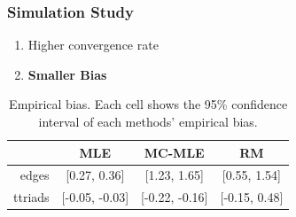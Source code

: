 \documentclass[aspectratio=169, 9pt]{beamer}
\begin{document}
\begin{frame}[t, label=ergmitoexperiment]
	\frametitle{Simulation Study}
	
	\begin{minipage}[t]{.3\linewidth}
		\begin{enumerate}
			\item Higher convergence rate
			\item \alert{\bf Smaller Bias}
		\end{enumerate}
		\vfill\hyperlink{ergmito-checklist}{}
	\end{minipage}
	\vfill\hfill\begin{minipage}[t]{.65\linewidth}\vspace{-.75cm}
		\begin{table}
			\centering
			\begin{tabular}{rccc}
				\toprule
				& MLE & MC-MLE & RM \\ 
				\midrule
				edges & [0.27, 0.36] & [1.23, 1.65] & [0.55, 1.54] \\ 
				ttriads & [-0.05, -0.03] & [-0.22, -0.16] & [-0.15, 0.48] \\ 
				\bottomrule
			\end{tabular}
			\caption[Empirical Biases per Method]{\label{tab:empirical-bias-sim}Empirical bias. Each cell shows the 95\% confidence interval of each methods' empirical bias.} 
		\end{table}
		
		\hfill\hyperlink{ergmito-bias}{}
	\end{minipage}
\end{frame}
\end{document}

